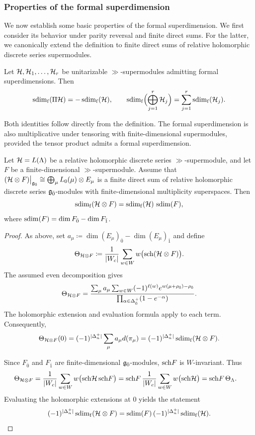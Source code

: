 \subsubsection{Properties of the formal superdimension}

We now establish some basic properties of the formal superdimension. We first consider its behavior under parity reversal and finite direct sums. For the latter, we canonically extend the definition to finite direct sums of relative holomorphic discrete series supermodules.

\begin{lemma}
Let ${\mathcal{H}},{\mathcal{H}}_1,\ldots,{\mathcal{H}}_r$ be unitarizable $\gg$-supermodules admitting formal superdimensions. Then
\begin{equation*}
\operatorname{sdim}_{\mathrm f}(\Pi{\mathcal{H}})=-\operatorname{sdim}_{\mathrm f}({\mathcal{H}}),
\qquad
\operatorname{sdim}_{\mathrm f}\Bigl(\bigoplus_{j=1}^r{\mathcal{H}}_j\Bigr)
=
\sum_{j=1}^r\operatorname{sdim}_{\mathrm f}({\mathcal{H}}_j).
\end{equation*}
\end{lemma}

Both identities follow directly from the definition. The formal superdimension is also multiplicative under tensoring with finite-dimensional supermodules, provided the tensor product admits a formal superdimension. 


\begin{lemma}\label{lemm::sdim_TP}
Let ${\mathcal{H}}=L(\Lambda)$ be a relative holomorphic discrete series
$\gg$-supermodule, and let $F$ be a finite-dimensional
$\gg$-supermodule. Assume that
$
({\mathcal{H}}\otimes F)\big|_{{\mathfrak{g}_{\bar{0}}}}
\cong
\bigoplus_\mu L_0(\mu)\otimes E_\mu
$
is a finite direct sum of relative holomorphic discrete series
${\mathfrak{g}_{\bar{0}}}$-modules with finite-dimensional multiplicity superspaces.
Then
\[
\operatorname{sdim}_{\mathrm f}({\mathcal{H}}\otimes F)=\operatorname{sdim}_{\mathrm f}({\mathcal{H}})\,\operatorname{sdim}(F),
\]
where $\operatorname{sdim}(F)=\dim F_{\bar0}-\dim F_{\bar1}$.
\end{lemma}

\begin{proof}
As above, set
$
a_{\mu}\coloneqq \dim(E_\mu)_{\bar0}-\dim(E_\mu)_{\bar1}
$
and define
\[
\Theta_{{\mathcal{H}}\otimes F}
\coloneqq 
\frac{1}{|W_c|}
\sum_{w\in W}w\bigl({\operatorname{sch}} ({\mathcal{H}}\otimes F)\bigr).
\]
The assumed even decomposition gives
\[
\Theta_{{\mathcal{H}}\otimes F}
=
\frac{
\sum_\mu a_{\mu}
\sum_{w\in W}(-1)^{\ell(w)}
e^{w(\mu+\rho_{\bar0})-\rho_{\bar0}}
}{
\prod_{\alpha\in\Delta_{\bar0}^{+}}
(1-e^{-\alpha})
}.
\]
The holomorphic extension and evaluation formula apply to each term.
Consequently,
\[
\Theta_{{\mathcal{H}}\otimes F}(0)
=
(-1)^{|\Delta_n^+|}
\sum_\mu a_{\mu} d(\pi_\mu)
=
(-1)^{|\Delta_n^+|}\operatorname{sdim}_{\mathrm f}({\mathcal{H}}\otimes F).
\]

Since $F_{\bar0}$ and $F_{\bar1}$ are finite-dimensional
${\mathfrak{g}_{\bar{0}}}$-modules, ${\operatorname{sch}} F$ is $W$-invariant. Thus
\[
\begin{aligned}
\Theta_{{\mathcal{H}}\otimes F}
&=
\frac{1}{|W_c|}
\sum_{w\in W}
w\bigl({\operatorname{sch}} {\mathcal{H}}\,{\operatorname{sch}} F\bigr)=
{\operatorname{sch}} F\,
\frac{1}{|W_c|}
\sum_{w\in W}w\bigl({\operatorname{sch}} {\mathcal{H}}\bigr)=
{\operatorname{sch}} F\,\Theta_\Lambda.
\end{aligned}
\]
Evaluating the holomorphic extensions at $0$ yields the statement
\[
(-1)^{|\Delta_n^+|}\operatorname{sdim}_{\mathrm f}({\mathcal{H}}\otimes F)
=
\operatorname{sdim}(F)\,(-1)^{|\Delta_n^+|}\operatorname{sdim}_{\mathrm f}({\mathcal{H}}).\qedhere
\]
\end{proof}

